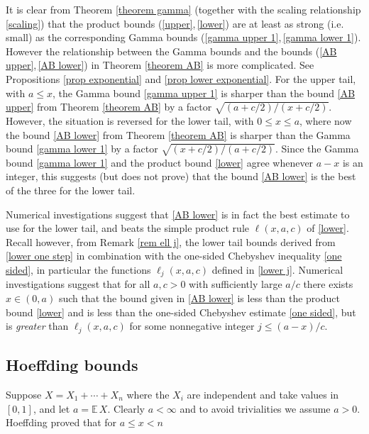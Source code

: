 \documentclass[smallextended,envcountsect]{svjour3}
\begin{document}
It is clear from Theorem \ref{theorem gamma} (together with the scaling relationship \eqref{scaling}) that the product bounds (\ref{upper},\,\ref{lower}) are at least as strong (i.e. small) as the corresponding Gamma bounds (\ref{gamma upper 1},\,\ref{gamma lower 1}).  However the relationship between the Gamma bounds and the bounds  (\ref{AB upper},\,\ref{AB lower}) in Theorem \ref{theorem AB} is more complicated.  See Propositions \ref{prop exponential} and \ref{prop lower exponential}.  For the upper tail, with $a \le x$, the Gamma bound \eqref{gamma upper 1} is sharper than the bound \eqref{AB upper} from Theorem \ref{theorem AB} by a factor $\sqrt{(a+c/2)/(x+c/2)}$.  However, the situation is reversed for the lower tail, with $0 \le x \le a$, where now the bound \eqref{AB lower} from Theorem \ref{theorem AB} is sharper than the Gamma bound \eqref{gamma lower 1} by a factor $\sqrt{(x+c/2)/(a+c/2)}$.  Since the Gamma bound \eqref{gamma lower 1} and the product bound \eqref{lower} agree whenever $a-x$ is an integer, this suggests (but does not prove) that the bound \eqref{AB lower} is the best of the three for the lower tail.

Numerical investigations suggest that \eqref{AB lower} is in fact the best estimate to use for the lower tail, and beats the simple product rule $\ell(x,a,c)$ of \eqref{lower}.  Recall however, from Remark \ref{rem ell j},  the lower tail bounds derived from
\eqref{lower one step} in combination with the one-sided Chebyshev inequality \eqref{one sided},  in particular the functions $\ell_j(x,a,c)$ defined in \eqref{lower j}.  Numerical investigations suggest that for all $a,c > 0$ with sufficiently large $a/c$ there exists $x \in (0,a)$ such that the bound given in \eqref{AB lower} is less than the product bound \eqref{lower} and is less than the one-sided Chebyshev estimate \eqref{one sided}, but is \emph{greater} than $\ell_j(x,a,c)$ for some nonnegative
integer $j\le (a-x)/c$.

\subsection{Hoeffding bounds} \label{sect Hoeffding} Suppose $X = X_1+ \cdots + X_n$ where the $X_i$ are independent and take values in $[0,1]$, and let $a = {\mathbb{E \,}} X$.  Clearly $a < \infty$ and to avoid trivialities we assume $a > 0$.  Hoeffding \cite[Thm 1]{hoeffding} proved that for $a \le x < n$
    
\end{document}
